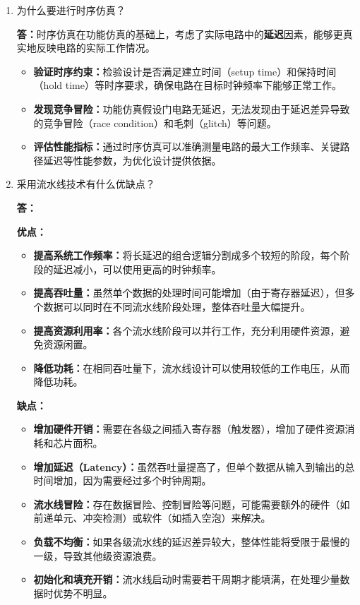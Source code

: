 \documentclass[12pt,a4paper,UTF8]{article}
\begin{document}
\begin{enumerate}
    \item 为什么要进行时序仿真？
    
    {\heiti\bfseries 答：}时序仿真在功能仿真的基础上，考虑了实际电路中的{\heiti\bfseries 延迟}因素，能够更真实地反映电路的实际工作情况。
    \begin{itemize}
        \item {\heiti\bfseries 验证时序约束：}检验设计是否满足建立时间（setup time）和保持时间（hold time）等时序要求，确保电路在目标时钟频率下能够正常工作。
        \item {\heiti\bfseries 发现竞争冒险：}功能仿真假设门电路无延迟，无法发现由于延迟差异导致的竞争冒险（race condition）和毛刺（glitch）等问题。
        \item {\heiti\bfseries 评估性能指标：}通过时序仿真可以准确测量电路的最大工作频率、关键路径延迟等性能参数，为优化设计提供依据。
    \end{itemize}
    
    \item 采用流水线技术有什么优缺点？

    {\heiti\bfseries 答：}
    
    {\heiti\bfseries 优点：}
    \begin{itemize}
        \item {\heiti\bfseries 提高系统工作频率：}将长延迟的组合逻辑分割成多个较短的阶段，每个阶段的延迟减小，可以使用更高的时钟频率。
        \item {\heiti\bfseries 提高吞吐量：}虽然单个数据的处理时间可能增加（由于寄存器延迟），但多个数据可以同时在不同流水线阶段处理，整体吞吐量大幅提升。
        \item {\heiti\bfseries 提高资源利用率：}各个流水线阶段可以并行工作，充分利用硬件资源，避免资源闲置。
        \item {\heiti\bfseries 降低功耗：}在相同吞吐量下，流水线设计可以使用较低的工作电压，从而降低功耗。
    \end{itemize}

   {\heiti\bfseries 缺点：}
    \begin{itemize}
        \item {\heiti\bfseries 增加硬件开销：}需要在各级之间插入寄存器（触发器），增加了硬件资源消耗和芯片面积。
        \item {\heiti\bfseries 增加延迟（Latency）：}虽然吞吐量提高了，但单个数据从输入到输出的总时间增加，因为需要经过多个时钟周期。
        \item {\heiti\bfseries 流水线冒险：}存在数据冒险、控制冒险等问题，可能需要额外的硬件（如前递单元、冲突检测）或软件（如插入空泡）来解决。
        \item {\heiti\bfseries 负载不均衡：}如果各级流水线的延迟差异较大，整体性能将受限于最慢的一级，导致其他级资源浪费。
        \item {\heiti\bfseries 初始化和填充开销：}流水线启动时需要若干周期才能填满，在处理少量数据时优势不明显。
    \end{itemize}
\end{enumerate}
\end{document}
